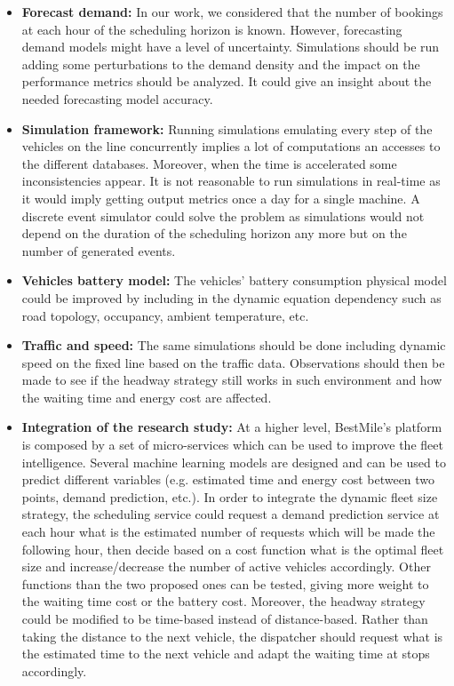 \documentclass[12pt,a4paper]{article}
\begin{document}
\begin{itemize}
\item \textbf{Forecast demand:} In our work, we considered that the number of bookings at each hour of the scheduling horizon is known. However, forecasting demand models might have a level of uncertainty. Simulations should be run adding some perturbations to the demand density and the impact on the performance metrics should be analyzed. It could give an insight about the needed forecasting model accuracy. 
\item \textbf{Simulation framework:} Running simulations emulating every step of the vehicles on the line concurrently implies a lot of computations an accesses to the different databases. Moreover, when the time is accelerated some inconsistencies appear. It is not reasonable to run simulations in real-time as it would imply getting output metrics once a day for a single machine. A discrete event simulator could solve the problem as simulations would not depend on the duration of the scheduling horizon any more but on the number of generated events.
\item \textbf{Vehicles battery model:} The vehicles' battery consumption physical model could be improved by including in the dynamic equation dependency such as road topology, occupancy, ambient temperature, etc. 
\item \textbf{Traffic and speed:} The same simulations should be done including dynamic speed on the fixed line based on the traffic data. Observations should then be made to see if the headway strategy still works in such environment and how the waiting time and energy cost are affected.
\item \textbf{Integration of the research study:} At a higher level, BestMile's platform is composed by a set of micro-services which can be used to improve the fleet intelligence. Several machine learning models are designed and can be used to predict different variables (e.g. estimated time and energy cost between two points, demand prediction, etc.). In order to integrate the dynamic fleet size strategy, the scheduling service could request a demand prediction service at each hour what is the estimated number of requests which will be made the following hour, then decide based on a cost function what is the optimal fleet size and increase/decrease the number of active vehicles accordingly. Other functions than the two proposed ones can be tested, giving more weight to the waiting time cost or the battery cost. Moreover, the headway strategy could be modified to be time-based instead of distance-based. Rather than taking the distance to the next vehicle, the dispatcher should request what is the estimated time to the next vehicle and adapt the waiting time at stops accordingly.

\end{itemize}
\end{document}
